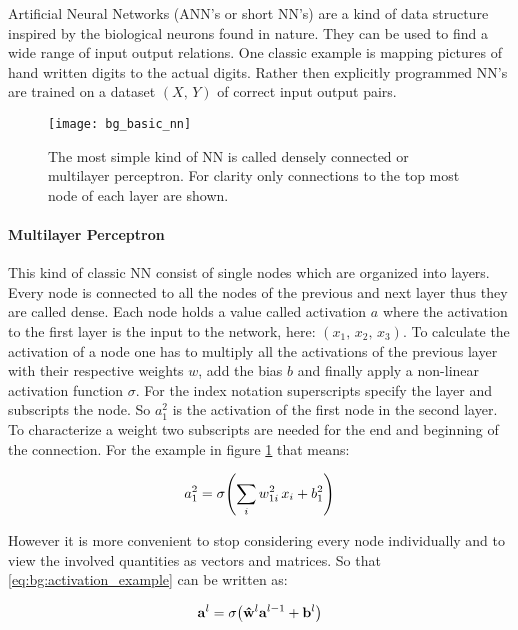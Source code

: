 Artificial Neural Networks (ANN's or short NN's) are a kind of data structure inspired by the biological neurons found in nature. They can be used to find a wide range of input output relations. One classic example is mapping pictures of hand written digits to the actual digits. Rather then explicitly programmed NN's are trained on a dataset $(X, \, Y)$ of correct input output pairs.
\\


\begin{figure}[H]
    \centering
    \texttt{[image: bg\_basic\_nn]}
    \caption{The most simple kind of NN is called densely connected or multilayer perceptron. For clarity only connections to the top most node of each layer are shown.}
    \label{fig:bg:basic_nn}
\end{figure}

\paragraph{Multilayer Perceptron}
This kind of classic NN consist of single nodes which are organized into layers. Every node is connected to all the nodes of the previous and next layer thus they are called dense. Each node holds a value called activation $a$ where the activation to the first layer is the input to the network, here:
$(x_1, \, x_2, \, x_3)$.
To calculate the activation of a node one has to multiply all the activations of the previous layer with their respective weights $w$, add the bias $b$ and finally apply a non-linear activation function $\sigma$. For the index notation superscripts specify the layer and subscripts the node. So $a^2_1$ is the activation of the first node in the second layer. To characterize a weight two subscripts are needed for the end and beginning of the connection. For the example in figure \ref{fig:bg:basic_nn} that means:

\begin{equation} \label{eq:bg:activation_example}
    a^2_1 = \sigma \qty(\sum_i w^2_{1i} \, x_i + b^2_1)
\end{equation}

\noindent
However it is more convenient to stop considering every node individually and to view the involved quantities as vectors and matrices. So that \eqref{eq:bg:activation_example} can be written as:

\begin{equation} \label{eq:bg:activation}
    \vb{a}^l = \sigma \qty(\vu{w}^l \vb{a}^{l-1} + \vb{b}^l)
\end{equation}


